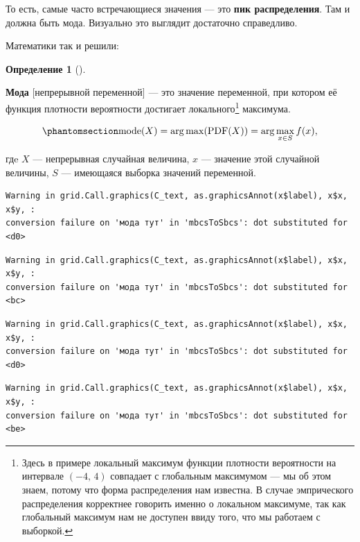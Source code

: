 \documentclass[
  letterpaper,
]{scrbook}
\theoremstyle{definition}
\newtheorem{definition}{Определение}[chapter]
\theoremstyle{remark}
\begin{document}
То есть, самые часто встречающиеся значения --- это \textbf{пик
распределения}. Там и должна быть мода. Визуально это выглядит
достаточно справедливо.

Математики так и решили:

\begin{definition}[]\protect\hypertarget{def-mode-continuous}{}\label{def-mode-continuous}

\textbf{Мода} {[}непрерывной переменной{]} --- это значение переменной,
при котором её функция плотности вероятности достигает
локального\footnote{Здесь в примере локальный максимум функции плотности
  вероятности на интервале \((-4, \, 4)\) совпадает с глобальным
  максимумом --- мы об этом знаем, потому что форма распределения нам
  известна. В случае эмпрического распределения корректнее говорить
  именно о локальном максимуме, так как глобальный максимум нам не
  доступен ввиду того, что мы работаем с выборкой.} максимума.

\end{definition}

\begin{equation}\phantomsection\label{eq-mode-pdf}{
\text{mode}(X) = \arg \max(\text{PDF}(X)) = \arg \max_{x \in S}f(x),
}\end{equation}

гдe \(X\) --- непрерывная случайная величина, \(x\) --- значение этой
случайной величины, \(S\) --- имеющаяся выборка значений переменной.

\begin{verbatim}
Warning in grid.Call.graphics(C_text, as.graphicsAnnot(x$label), x$x, x$y, :
conversion failure on 'мода тут' in 'mbcsToSbcs': dot substituted for <d0>
\end{verbatim}

\begin{verbatim}
Warning in grid.Call.graphics(C_text, as.graphicsAnnot(x$label), x$x, x$y, :
conversion failure on 'мода тут' in 'mbcsToSbcs': dot substituted for <bc>
\end{verbatim}

\begin{verbatim}
Warning in grid.Call.graphics(C_text, as.graphicsAnnot(x$label), x$x, x$y, :
conversion failure on 'мода тут' in 'mbcsToSbcs': dot substituted for <d0>
\end{verbatim}

\begin{verbatim}
Warning in grid.Call.graphics(C_text, as.graphicsAnnot(x$label), x$x, x$y, :
conversion failure on 'мода тут' in 'mbcsToSbcs': dot substituted for <be>
\end{verbatim}
\end{document}

